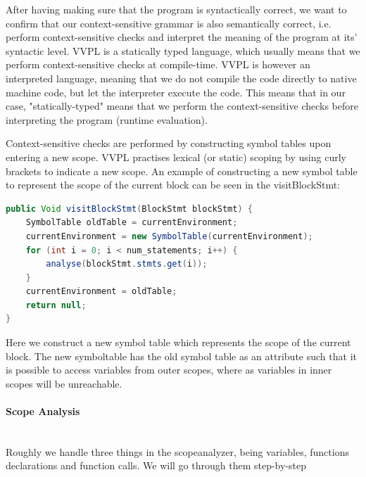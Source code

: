 


After having making sure that the program is syntactically correct, we want to confirm that our context-sensitive grammar is also semantically correct, 
i.e. perform context-sensitive checks and interpret the meaning of the program at its' syntactic level.
VVPL is a statically typed language, which usually means that we perform context-sensitive checks at compile-time. 
VVPL is however an interpreted language, meaning that we do not compile the code directly to native machine code, but let the interpreter execute the code.
This means that in our case, "statically-typed" means that we perform the context-sensitive checks before interpreting the program (runtime evaluation).

Context-sensitive checks are performed by constructing symbol tables upon entering a new scope.
VVPL practises lexical (or static) scoping by using curly brackets to indicate a new scope. 
An example of constructing a new symbol table to represent the scope of the current block can be seen in the visitBlockStmt:

\begin{lstlisting}[language=java]
public Void visitBlockStmt(BlockStmt blockStmt) {
    SymbolTable oldTable = currentEnvironment;
    currentEnvironment = new SymbolTable(currentEnvironment);
    for (int i = 0; i < num_statements; i++) {
        analyse(blockStmt.stmts.get(i));
    }
    currentEnvironment = oldTable;
    return null;
}
\end{lstlisting}

Here we construct a new symbol table which represents the scope of the current block. The new symboltable has the old symbol table as an attribute such
that it is possible to access variables from outer scopes, where as variables in inner scopes will be unreachable.

\paragraph{Scope Analysis}\mbox{}\\
Roughly we handle three things in the scopeanalyzer, being variables, functions declarations and function calls. We will go through them step-by-step


